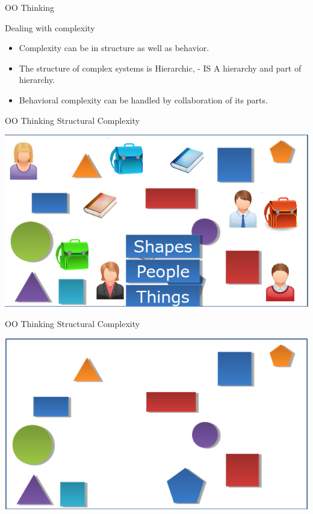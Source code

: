 \documentclass[14pt]{beamer}
\begin{document}
\begin{frame}{OO Thinking}
\begin{block}{}
  Dealing with complexity   
 \end{block}
\begin{itemize}
\item Complexity can be in structure as well as behavior.
\item The structure of complex systems is Hierarchic, - IS A hierarchy and part of hierarchy.
\item Behavioral complexity can be handled by collaboration of its parts.
 \end{itemize}
 \end{frame}
\begin{frame}{OO Thinking}
Structural Complexity
\begin{center}
    \includegraphics[scale=0.5]{Image5.png}
\end{center}
\end{frame}
\begin{frame}{OO Thinking}
Structural Complexity
\begin{center}
    \includegraphics[scale=0.5]{Image6.png}
\end{center}
\end{frame}
\end{document}
